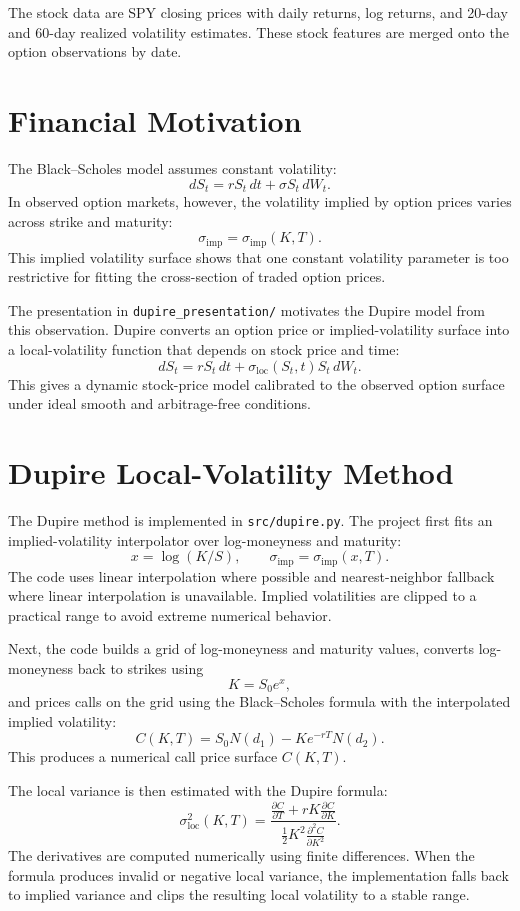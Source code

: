 \documentclass[11pt]{article}
\begin{document}
The stock data are SPY closing prices with daily returns, log returns, and
20-day and 60-day realized volatility estimates. These stock features are merged
onto the option observations by date.

\section*{Financial Motivation}

The Black--Scholes model assumes constant volatility:
\[
    dS_t = rS_t\,dt + \sigma S_t\,dW_t.
\]
In observed option markets, however, the volatility implied by option prices
varies across strike and maturity:
\[
    \sigma_{\mathrm{imp}} = \sigma_{\mathrm{imp}}(K,T).
\]
This implied volatility surface shows that one constant volatility parameter is
too restrictive for fitting the cross-section of traded option prices.

The presentation in \texttt{dupire\_presentation/} motivates the Dupire model
from this observation. Dupire converts an option price or implied-volatility
surface into a local-volatility function that depends on stock price and time:
\[
    dS_t = rS_t\,dt + \sigma_{\mathrm{loc}}(S_t,t)S_t\,dW_t.
\]
This gives a dynamic stock-price model calibrated to the observed option surface
under ideal smooth and arbitrage-free conditions.

\section*{Dupire Local-Volatility Method}

The Dupire method is implemented in \texttt{src/dupire.py}. The project first
fits an implied-volatility interpolator over log-moneyness and maturity:
\[
    x = \log(K/S), \qquad \sigma_{\mathrm{imp}} = \sigma_{\mathrm{imp}}(x,T).
\]
The code uses linear interpolation where possible and nearest-neighbor fallback
where linear interpolation is unavailable. Implied volatilities are clipped to a
practical range to avoid extreme numerical behavior.

Next, the code builds a grid of log-moneyness and maturity values, converts
log-moneyness back to strikes using
\[
    K = S_0 e^x,
\]
and prices calls on the grid using the Black--Scholes formula with the
interpolated implied volatility:
\[
    C(K,T) =
    S_0 N(d_1) - K e^{-rT}N(d_2).
\]
This produces a numerical call price surface $C(K,T)$.

The local variance is then estimated with the Dupire formula:
\[
    \sigma_{\mathrm{loc}}^2(K,T)
    =
    \frac{
    \frac{\partial C}{\partial T}
    + rK\frac{\partial C}{\partial K}
    }{
    \frac{1}{2}K^2\frac{\partial^2 C}{\partial K^2}
    }.
\]
The derivatives are computed numerically using finite differences. When the
formula produces invalid or negative local variance, the implementation falls
back to implied variance and clips the resulting local volatility to a stable
range.
\end{document}
